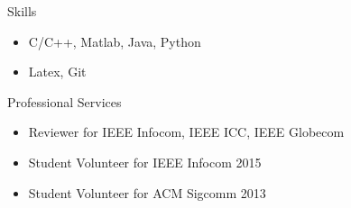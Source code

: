 \documentclass{resume} %
\begin{document}
\begin{rSection}{Skills}
\begin{itemize}
 \setlength{\itemsep}{0.2em}
    \setlength{\parskip}{0pt}
\item C/C++, Matlab, Java, Python
\item Latex, Git
\end{itemize}
\end{rSection}

\begin{rSection}{Professional Services}
\begin{itemize}
 \setlength{\itemsep}{0.2em}
    \setlength{\parskip}{0pt}
\item Reviewer for IEEE Infocom, IEEE ICC, IEEE Globecom 
\item Student Volunteer for IEEE Infocom 2015 
\item Student Volunteer for ACM Sigcomm 2013
\end{itemize}
\end{rSection}
\end{document}
